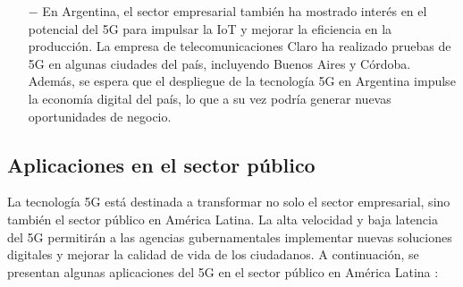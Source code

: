 \documentclass[12pt]{article}
\begin{document}
\begin{itemize}
                \item [$-$] En Argentina, el sector empresarial también ha mostrado interés en el potencial del 5G para impulsar la IoT y mejorar la eficiencia en la producción. La empresa de telecomunicaciones Claro ha realizado pruebas de 5G en algunas ciudades del país, incluyendo Buenos Aires y Córdoba. Además, se espera que el despliegue de la tecnología 5G en Argentina impulse la economía digital del país, lo que a su vez podría generar nuevas oportunidades de negocio.
                
            \end{itemize}



        \subsection{Aplicaciones en el sector público}

            La tecnología 5G está destinada a transformar no solo el sector empresarial, sino también el sector público en América Latina. La alta velocidad y baja latencia del 5G permitirán a las agencias gubernamentales implementar nuevas soluciones digitales y mejorar la calidad de vida de los ciudadanos. A continuación, se presentan algunas aplicaciones del 5G en el sector público en América Latina \cite{monroy2020análisis}:
\end{document}
